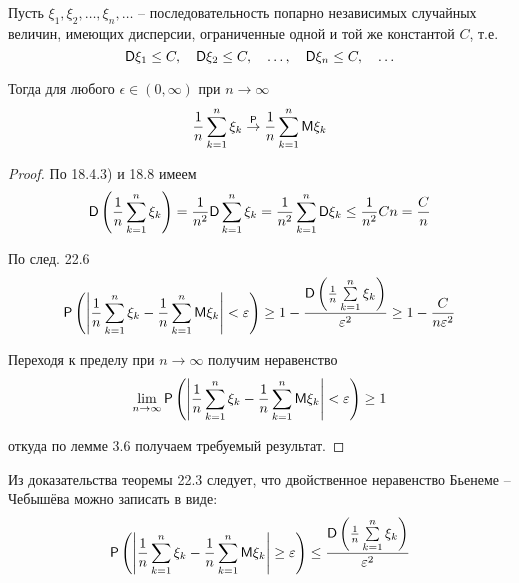 \begin{theorem}
Пусть $\xi_1 , \xi_2 , \ldots , \xi_n , \ldots$ -- последовательность попарно независимых случайных величин, имеющих дисперсии, ограниченные одной и той же константой $C$, т.е.
$$
\mathsf{D}\xi_1 \leq C,\quad
\mathsf{D}\xi_2 \leq C,\quad
\ldots,\quad
\mathsf{D}\xi_n \leq C,\quad
\ldots
$$


Тогда для любого $\epsilon \in (0, \infty)$ при $n \to \infty$
$$
	\frac{1}{n}\sum\limits_{k=1}^n \xi_k
	\stackrel{\mathsf{P}}{\to}
	\frac{1}{n}\sum\limits_{k=1}^n \mathsf{M}\xi_k
$$
\end{theorem}

\begin{proof}
По 18.4.3) и 18.8 имеем	
$$
	\mathsf{D}\left(
		\frac{1}{n}\sum\limits_{k=1}^n \xi_k
	\right)=
	\frac{1}{n^2}\mathsf{D}\sum\limits_{k=1}^n \xi_k=
	\frac{1}{n^2}\sum\limits_{k=1}^n \mathsf{D}\xi_k\leq
	\frac{1}{n^2}Cn=\frac{C}{n}
$$

По след. 22.6
$$
	\mathsf{P}\left(\left|
		\frac{1}{n}\sum\limits_{k=1}^n \xi_k-
		\frac{1}{n}\sum\limits_{k=1}^n \mathsf{M}\xi_k
	\right|<\varepsilon\right)
	\geq
	1-\frac{\mathsf{D}\left(\frac{1}{n}\sum\limits_{k=1}^n \xi_k\right)}{\varepsilon^2}\geq 1-\frac{C}{n\varepsilon^2}
$$

Переходя к пределу при $n \to \infty$ получим неравенство
$$
	\lim\limits_{n\to\infty}
	\mathsf{P}\left(\left|
		\frac{1}{n}\sum\limits_{k=1}^n \xi_k-
		\frac{1}{n}\sum\limits_{k=1}^n \mathsf{M}\xi_k
	\right|<\varepsilon\right)\geq 1
$$

откуда по лемме 3.6 получаем требуемый результат.
\end{proof}
\begin{zam}
Из доказательства теоремы 22.3 следует, что двойственное неравенство Бьенеме – Чебышёва можно записать в виде:
\begin{equation}
	\label{bch}
	\mathsf{P}\left(\left|
		\frac{1}{n}\sum\limits_{k=1}^n \xi_k-
		\frac{1}{n}\sum\limits_{k=1}^n \mathsf{M}\xi_k
	\right|\geq\varepsilon\right)\leq \frac{\mathsf{D}\left(\frac{1}{n}\sum\limits_{k=1}^n \xi_k\right)}{\varepsilon^2}
\end{equation}
\end{zam}

